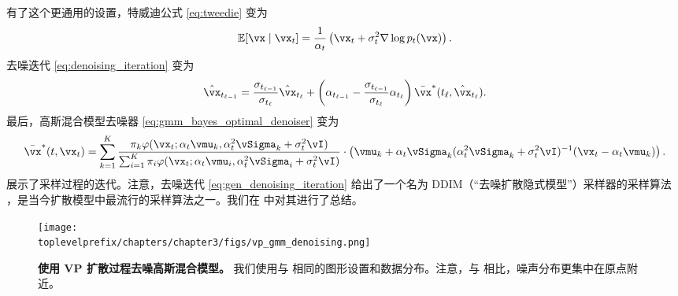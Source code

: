 \documentclass[../../book-main_zh.tex]{subfiles}
\begin{document}
有了这个更通用的设置，特威迪公式 \eqref{eq:tweedie} 变为
\begin{equation}\label{eq:gen_tweedie}
	\Ex[\vx \mid \vx_{t}] = \frac{1}{\alpha_{t}}\bp{\vx_{t} + \sigma_{t}^{2}\nabla \log p_{t}(\vx)}.
\end{equation}
去噪迭代 \eqref{eq:denoising_iteration} 变为
\begin{equation}\label{eq:gen_denoising_iteration}
	\hat{\vx}_{t_{\ell - 1}} = \frac{\sigma_{t_{\ell - 1}}}{\sigma_{t_{\ell}}}\hat{\vx}_{t_{\ell}} + \bp{\alpha_{t_{\ell - 1}} - \frac{\sigma_{t_{\ell - 1}}}{\sigma_{t_{\ell}}}\alpha_{t_{\ell}}}\bar{\vx}^{\ast}(t_{\ell}, \hat{\vx}_{t_{\ell}}).
\end{equation}
最后，高斯混合模型去噪器 \eqref{eq:gmm_bayes_optimal_denoiser} 变为
\begin{equation}\label{eq:gen_gmm_bayes_optimal_denoiser}
	\bar{\vx}^{\ast}(t, \vx_{t}) = \sum_{k = 1}^{K}\frac{\pi_{k}\phi(\vx_{t}
	; \alpha_{t}\vmu_{k}, \alpha_{t}^{2}\vSigma_{k}
	+ \sigma_{t}^{2}\vI)}{\sum_{i = 1}^{K}\pi_{i}\phi(\vx_{t} ; \alpha_{t}\vmu_{i}, \alpha_{t}^{2}\vSigma_{i} + \sigma_{t}^{2}\vI)}\cdot\bp{\vmu_{k} + \alpha_{t}\vSigma_{k}(\alpha_{t}^{2}\vSigma_{k} + \sigma_{t}^{2}\vI)^{-1}(\vx_{t} - \alpha_{t}\vmu_{k})}.
\end{equation}
 展示了采样过程的迭代。注意，去噪迭代 \eqref{eq:gen_denoising_iteration} 给出了一个名为 DDIM（“去噪扩散隐式模型”）采样器的采样算法 \cite{song2020denoising}，是当今扩散模型中最流行的采样算法之一。我们在  中对其进行了总结。

\begin{figure}
	\centering 
	\texttt{[image: \\toplevelprefix/chapters/chapter3/figs/vp\_gmm\_denoising.png]}
	\caption{\small\textbf{使用 VP 扩散过程去噪高斯混合模型。} 我们使用与  相同的图形设置和数据分布。注意，与  相比，噪声分布更集中在原点附近。}
	\label{fig:vp_gmm_denoising}
\end{figure}
\end{document}

